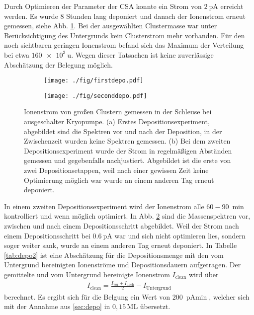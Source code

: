 Durch Optimieren der Parameter der CSA konnte ein Strom von $\SI{2}{\pA}$ erreicht werden.
Es wurde 8 Stunden lang deponiert und danach der Ionenstrom erneut gemessen, siehe Abb. \ref{fig:firstdepo}.
Bei der ausgewählten Clustermasse war unter Berücksichtigung des Untergrunds kein Clusterstrom mehr vorhanden. 
Für den noch sichtbaren geringen Ionenstrom befand sich das Maximum der Verteilung bei etwa $\SI{160e3}{\amu}$.
Wegen dieser Tatsachen ist keine zuverlässige Abschätzung der Belegung möglich.\\
\begin{figure}[h]
  \begin{subfigure}[h]{\textwidth}
    \texttt{[image: ./fig/firstdepo.pdf]}
    \caption{}
    \label{fig:firstdepo}
  \end{subfigure}\hfill
  \begin{subfigure}[t]{\textwidth}
    \texttt{[image: ./fig/seconddepo.pdf]}
    \caption{}
    \label{fig:seconddepo}
  \end{subfigure}
  \caption{Ionenstrom von großen Clustern gemessen in der Schleuse bei ausgeschalter Kryopumpe. (a) Erstes Depositionsexperiment, abgebildet sind die Spektren vor und nach der Deposition, in der Zwischenzeit wurden keine Spektren gemessen. (b) Bei dem zweiten Depositionsexperiment wurde der Strom in regelmäßigen Abständen gemessen und gegebenfalls nachjustiert. Abgebildet ist die erste von zwei Depositionsetappen, weil nach einer gewissen Zeit keine Optimierung möglich war wurde an einem anderen Tag erneut deponiert.} 
  \label{fig:deposition}
\end{figure}

In einem zweiten Depositionsexperiment wird der Ionenstrom alle $60 - \SI{90}{\min}$ kontrolliert und wenn möglich optimiert.
In Abb. \ref{fig:seconddepo} sind die Massenspektren vor, zwischen und nach einem Depositionsschritt abgebildet. 
Weil der Strom nach einem Depositionsschritt bei $\SI{0.6}{\pA}$ war und sich nicht optimieren lies, sondern soger weiter sank, wurde an einem anderen Tag erneut deponiert.
In Tabelle \ref{tab:depo2} ist eine Abschätzung für die Depositionsmenge mit den vom Untergrund bereinigten Ionenströme und Depositionsdauern aufgetragen. Der gemittelte und vom Untergrund bereinigte Ionenstrom $I_{\text{clean}}$ wird über
\begin{align*}
  I_{\text{clean}}=\frac{I_{\text{vor}}+I_{\text{nach}}}{2}-I_{\text{Untergrund}}
\end{align*} 
berechnet. Es ergibt sich für die Belgung ein Wert von $\SI{200}{\pA\min}$, welcher sich mit der Annahme aus \ref{sec:depo} in $0,15\,$ML übersetzt.

